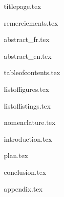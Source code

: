 \documentclass[%
    paper=A4,               %
    twoside=true,           %
    openright,              %
    chapterprefix=true,     %
    12pt,                   %
    headings=normal,        %
    bibliography=totoc,     %
    titlepage=on,           %
    captions=tableabove,    %
    draft=false             %
]{book}%
\begin{document}
\nocite{*}

{titlepage.tex}

\frontmatter{}

\thispagestyle{frontmatterstyle}\pagestyle{frontmatterstyle}\setcounter{page}{1}

{remerciements.tex}\clearpage{}

{abstract_fr.tex}\clearpage{}

{abstract_en.tex}\clearpage{}

{tableofcontents.tex}\clearpage{}

{listoffigures.tex}\clearpage{}

{listoflistings.tex}\clearpage{}

{nomenclature.tex}\clearpage{}



\thispagestyle{mainmatterstyle}\pagestyle{mainmatterstyle}
\mainmatter{}
\clearpage{}

{introduction.tex}

{plan.tex}



{conclusion.tex}



{appendix.tex}



\thispagestyle{frontmatterstyle}\pagestyle{frontmatterstyle}
\backmatter{}
\clearpage{}

\printbibliography[
    heading=bibliography
]
\end{document}
